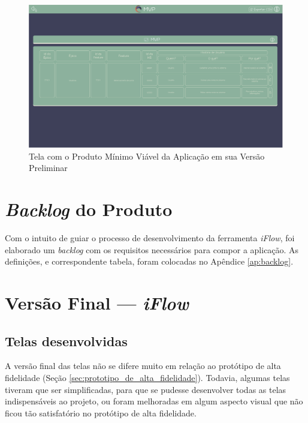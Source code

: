 \begin{itemize}
\begin{figure}[]
      \begin{center}
          \caption{{Tela com o Produto Mínimo Viável da Aplicação em sua Versão Preliminar}}
          \label{fig:mvp}
          \includegraphics[scale=0.36]{figuras/Prototipo/mvp.png}
    \end{center}
    \end{figure}
\end{itemize}

\section{\textit{Backlog} do Produto}

\label{sec:backlog_do_produto}

Com o intuito de guiar o processo de desenvolvimento da ferramenta \textit{iFlow}, foi elaborado um \textit{backlog} com os requisitos necessários para compor a aplicação. As definições, e correspondente tabela, foram colocadas no Apêndice \ref{ap:backlog}.

\section{Versão Final — \textit{iFlow}}
\label{sec:versao_final_iFlow}

\subsection{Telas desenvolvidas}

A versão final das telas não se difere muito em relação ao protótipo de alta fidelidade (Seção \ref{sec:prototipo_de_alta_fidelidade}). Todavia, algumas telas tiveram que ser simplificadas, para que se pudesse desenvolver todas as telas indispensáveis ao projeto, ou foram melhoradas em algum aspecto visual que não ficou tão satisfatório no protótipo de alta fidelidade.

